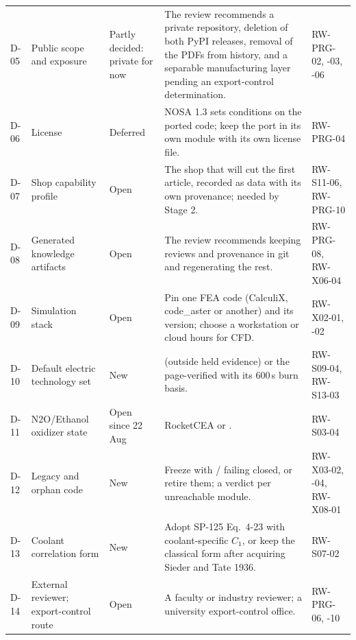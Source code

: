 {\begin{longtable}{@{}P{0.9cm}P{3.0cm}P{1.9cm}P{6.8cm}P{3.0cm}@{}}
D-05 & Public scope and exposure & Partly decided: private for now & The review recommends a private repository, deletion of both PyPI releases, removal of the PDFs from history, and a separable manufacturing layer pending an export-control determination. & RW-PRG-02, -03, -06 \\
D-06 & License & Deferred & NOSA 1.3 sets conditions on the ported code; keep the port in its own module with its own license file. & RW-PRG-04 \\
D-07 & Shop capability profile & Open & The shop that will cut the first article, recorded as data with its own provenance; needed by Stage 2. & RW-S11-06, RW-PRG-10 \\
D-08 & Generated knowledge artifacts & Open & The review recommends keeping reviews and provenance in git and regenerating the rest. & RW-PRG-08, RW-X06-04 \\
D-09 & Simulation stack & Open & Pin one FEA code (CalculiX, code\_aster or another) and its version; choose a workstation or cloud hours for CFD. & RW-X02-01, -02 \\
D-10 & Default electric technology set & New &  (outside held evidence) or the page-verified  with its 600\,s burn basis. & RW-S09-04, RW-S13-03 \\
D-11 & N2O/Ethanol oxidizer state & Open since 22 Aug & RocketCEA  or . & RW-S03-04 \\
D-12 & Legacy and orphan code & New & Freeze  with / failing closed, or retire them; a verdict per unreachable module. & RW-X03-02, -04, RW-X08-01 \\
D-13 & Coolant correlation form & New & Adopt SP-125 Eq.\ 4-23 with coolant-specific $C_1$, or keep the classical form after acquiring Sieder and Tate 1936. & RW-S07-02 \\
D-14 & External reviewer; export-control route & Open & A faculty or industry reviewer; a university export-control office. & RW-PRG-06, -10 \\
\bottomrule
\end{longtable}
}
